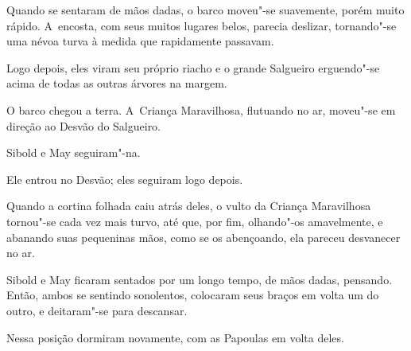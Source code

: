 Quando se sentaram de mãos dadas, o barco moveu"-se suavemente, porém
muito rápido. A~encosta, com seus muitos lugares belos, parecia
deslizar, tornando"-se uma névoa turva à medida que rapidamente passavam.

Logo depois, eles viram seu próprio riacho e o grande Salgueiro
erguendo"-se acima de todas as outras árvores na margem.

O barco chegou a terra. A~Criança Maravilhosa, flutuando no ar, moveu"-se
em direção ao Desvão do Salgueiro.

Sibold e May seguiram"-na.

Ele entrou no Desvão; eles seguiram logo depois.

Quando a cortina folhada caiu atrás deles, o vulto da Criança
Maravilhosa tornou"-se cada vez mais turvo, até que, por fim, olhando"-os
amavelmente, e abanando suas pequeninas mãos, como se os abençoando, ela
pareceu desvanecer no ar.


Sibold e May ficaram sentados por um longo tempo, de mãos dadas,
pensando. Então, ambos se sentindo sonolentos, colocaram seus braços em
volta um do outro, e deitaram"-se para descansar.

Nessa posição dormiram novamente, com as Papoulas em volta deles.
